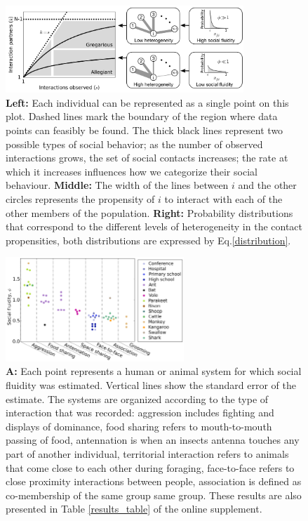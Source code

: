 \documentclass[10pt]{article}
\begin{document}
\begin{multicols}{2}

\begin{figure}[t]
	\centering
	\includegraphics[width=0.8\textwidth]{Figures/concept_fig.png}\qquad	
  	\caption{\textbf{Left:} Each individual can be represented as a single point on this plot. Dashed lines mark the boundary of the region where data points can feasibly be found. The thick black lines represent two possible types of social behavior; as the number of observed interactions grows, the set of social contacts increases; the rate at which it increases influences how we categorize their social behaviour. \textbf{Middle:} The width of the lines between $i$ and the other circles represents the propensity of $i$ to interact with each of the other members of the population. \textbf{Right:} Probability distributions that correspond to the different levels of heterogeneity in the contact propensities, both distributions are expressed by Eq.\eqref{distribution}.\label{concept_fig}}
\end{figure}

\begin{figure}[t]
	\centering
	\includegraphics[width=0.6\textwidth]{Figures/interaction_types.png}
  	\caption{\textbf{A:} Each point represents a human or animal system for which social fluidity was estimated. Vertical lines show the standard error of the estimate. The systems are organized according to the type of interaction that was recorded: aggression includes fighting and displays of dominance, food sharing refers to mouth-to-mouth passing of food, antennation is when an insects antenna touches any part of another individual, territorial interaction refers to animals that come close to each other during foraging, face-to-face refers to close proximity interactions between people, association is defined as co-membership of the same group same group. These results are also presented in Table \ref{results_table} of the online supplement. \label{phi_for_all_networks}}
	\label{phi_fig}
\end{figure}


\end{multicols}
\end{document}
